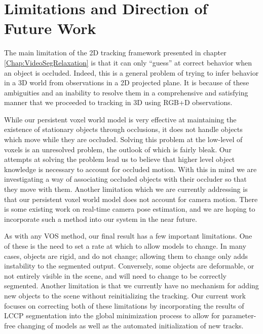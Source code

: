 \section{Limitations and Direction of Future Work}
The main limitation of the 2D tracking framework presented in chapter \ref{Chap:VideoSegRelaxation} is that it can only ``guess'' at correct behavior when an object is occluded. Indeed, this is a general problem of trying to infer behavior in a 3D world from observations in a 2D projected plane. It is because of these ambiguities and an inability to resolve them in a comprehensive and satisfying manner that we proceeded to tracking in 3D using RGB+D observations.

While our persistent voxel world model is very effective at maintaining the existence of stationary objects through occlusions, it does not handle objects which move while they are occluded. Solving this problem at the low-level of voxels is an unresolved problem, the outlook of which is fairly bleak. Our attempts at solving the problem lead us to believe that higher level object knowledge is necessary to account for occluded motion. With this in mind we are investigating a way of associating occluded objects with their occluder so that they move with them. Another limitation which we are currently addressing is that our persistent voxel world model does not account for camera motion. There is some existing work on real-time camera pose estimation, and we are hoping to incorporate such a method into our system in the near future.

As with any VOS method, our final result has a few important limitations. One of these is the need to set a rate at which to allow models to change. In many cases, objects are rigid, and do not change; allowing them to change only adds instability to the segmented output. Conversely, some objects are deformable, or not entirely visible in the scene, and will need to change to be correctly segmented. Another limitation is that we currently have no mechanism for adding new objects to the scene without reinitializing the tracking. Our current work focuses on correcting both of these limitations by incorporating the results of LCCP segmentation into the global minimization process to allow for parameter-free changing of models as well as the automated initialization of new tracks.







